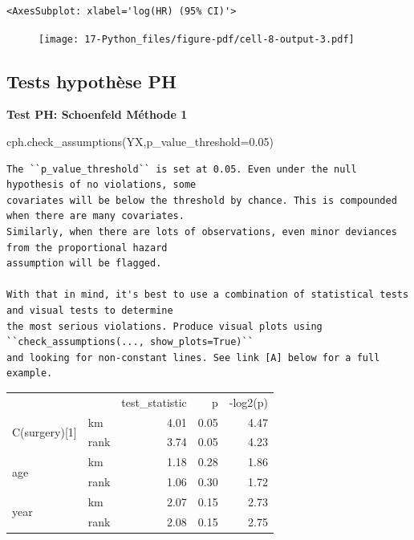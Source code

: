 \documentclass[
  12pt,
  letterpaper,
  DIV=11,
  numbers=noendperiod,
  onepage,
  openany]{scrreprt}
\newenvironment{Shaded}{\begin{snugshade}}{\end{snugshade}}
\newcommand{\FloatTok}[1]{\textcolor[rgb]{0.75,0.75,0.82}{#1}}
\newcommand{\NormalTok}[1]{\textcolor[rgb]{0.80,0.80,0.80}{#1}}
\newcommand{\OperatorTok}[1]{\textcolor[rgb]{0.94,0.94,0.82}{#1}}
\begin{document}
\begin{verbatim}
<AxesSubplot: xlabel='log(HR) (95% CI)'>
\end{verbatim}

\begin{figure}[H]

{\centering \texttt{[image: 17-Python\_files/figure-pdf/cell-8-output-3.pdf]}

}

\end{figure}

\hypertarget{tests-hypothuxe8se-ph}{%
\subsection{Tests hypothèse PH}\label{tests-hypothuxe8se-ph}}

\textbf{Test PH: Schoenfeld Méthode 1}

\begin{Shaded}
\begin{Highlighting}[]
\NormalTok{cph.check\_assumptions(YX,p\_value\_threshold}\OperatorTok{=}\FloatTok{0.05}\NormalTok{)}
\end{Highlighting}
\end{Shaded}

\begin{verbatim}
The ``p_value_threshold`` is set at 0.05. Even under the null hypothesis of no violations, some
covariates will be below the threshold by chance. This is compounded when there are many covariates.
Similarly, when there are lots of observations, even minor deviances from the proportional hazard
assumption will be flagged.

With that in mind, it's best to use a combination of statistical tests and visual tests to determine
the most serious violations. Produce visual plots using ``check_assumptions(..., show_plots=True)``
and looking for non-constant lines. See link [A] below for a full example.
\end{verbatim}

\begin{tabular}{llrrr}
 &  & test_statistic & p & -log2(p) \\
\multirow[c]{2}{*}{C(surgery)[1]} & km & 4.01 & 0.05 & 4.47 \\
 & rank & 3.74 & 0.05 & 4.23 \\
\multirow[c]{2}{*}{age} & km & 1.18 & 0.28 & 1.86 \\
 & rank & 1.06 & 0.30 & 1.72 \\
\multirow[c]{2}{*}{year} & km & 2.07 & 0.15 & 2.73 \\
 & rank & 2.08 & 0.15 & 2.75 \\
\end{tabular}
\end{document}
